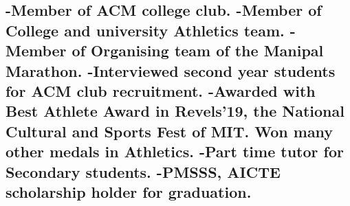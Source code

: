 \documentclass{article}
\begin{document}
    \subsection{\textmd{-Member of ACM college club. }\newline
    \textmd{-Member of College and university Athletics team. }\newline
    \textmd{-Member of Organising team of the Manipal Marathon. }\newline
    \textmd{-Interviewed second year students for ACM club recruitment. }\newline
    \textmd{-Awarded with Best Athlete Award in Revels'19, the National Cultural and Sports Fest of MIT. Won many other medals in Athletics. }\newline
    \textmd{-Part time tutor for Secondary students. }\newline
    \textmd{-PMSSS, AICTE scholarship holder for graduation.}}



\end{document}
